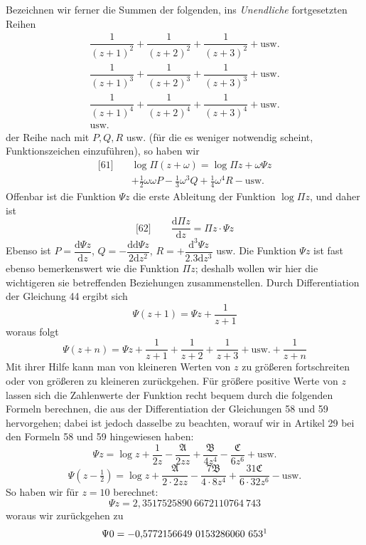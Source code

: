 Bezeichnen wir ferner die Summen der folgenden, ins \textit{Unendliche} fortgesetzten Reihen
\[
\begin{array}{l}
\dfrac{1}{(z+1)^2}+\dfrac{1}{(z+2)^2}+\dfrac{1}{(z+3)^2}+\text{usw.}\\[10pt]
\dfrac{1}{(z+1)^3}+\dfrac{1}{(z+2)^3}+\dfrac{1}{(z+3)^3}+\text{usw.}\\[10pt]
\dfrac{1}{(z+1)^4}+\dfrac{1}{(z+2)^4}+\dfrac{1}{(z+3)^4}+\text{usw.}\\[10pt]
\text{usw.}
\end{array}
\]
der Reihe nach mit $P,Q,R$ usw. (für die es weniger notwendig scheint, Funktionszeichen einzuführen), so haben wir
\[
\begin{aligned}
{}\text{[61]}\quad&\log\Pi(z+\omega)=\log\Pi z+\omega\Psi z\\[4pt]
&+\tfrac12\omega\omega P-\tfrac13\omega^3Q+\tfrac14\omega^4R-\text{usw.}
\end{aligned}
\]
Offenbar ist die Funktion $\Psi z$ die erste Ableitung der Funktion $\log\Pi z$, und daher ist
\[
{}\text{[62]}\qquad \frac{\mathrm{d}\Pi z}{\mathrm{d}z}=\Pi z\cdot\Psi z
\]
Ebenso ist $P=\dfrac{\mathrm{d}\Psi z}{\mathrm{d}z}$, $Q=-\dfrac{\mathrm{dd}\Psi z}{2\mathrm{d}z^2}$, $R=+\dfrac{\mathrm{d}^3\Psi z}{2.3\mathrm{d}z^3}$ usw.
Die Funktion $\Psi z$ ist fast ebenso bemerkenswert wie die Funktion $\Pi z$; deshalb wollen wir hier die wichtigeren sie betreffenden Beziehungen zusammenstellen. Durch Differentiation der Gleichung 44 ergibt sich
\[
\Psi(z+1)=\Psi z+\frac{1}{z+1}\tag*{[63]}
\]
woraus folgt
\[
\Psi(z+n)=\Psi z+\frac{1}{z+1}+\frac{1}{z+2}+\frac{1}{z+3}+\text{usw.}+\frac{1}{z+n}\tag*{[64]}
\]
Mit ihrer Hilfe kann man von kleineren Werten von $z$ zu größeren fortschreiten oder von größeren zu kleineren zurückgehen. Für größere positive Werte von $z$ lassen sich die Zahlenwerte der Funktion recht bequem durch die folgenden Formeln berechnen, die aus der Differentiation der Gleichungen 58 und 59 hervorgehen; dabei ist jedoch dasselbe zu beachten, worauf wir in Artikel 29 bei den Formeln 58 und 59 hingewiesen haben:
\[
\Psi z=\log z+\frac{1}{2z}-\frac{\mathfrak{A}}{2zz}+\frac{\mathfrak{B}}{4z^4}-\frac{\mathfrak{C}}{6z^6}+\text{usw.}\tag*{[65]}
\]
\[
\Psi\left(z-\tfrac12\right)=\log z+\frac{\mathfrak{A}}{2\cdot2zz}-\frac{7\mathfrak{B}}{4\cdot8z^4}+\frac{31\mathfrak{C}}{6\cdot32z^6}-\text{usw.}\tag*{[66]}
\]
So haben wir für $z=10$ berechnet:
\[
\Psi z=2{,}3517525890\ 6672110764\ 743
\]
woraus wir zurückgehen zu
\[
\Psi0=-0{,}5772156649\ 0153286060\ 653\HistoricalNote{18}
\]
